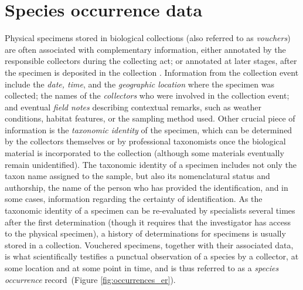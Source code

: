 \section{Species occurrence data} \label{section:occurrence_data}
Physical specimens stored in biological collections (also referred to as \textit{vouchers}) are often associated with complementary information, either annotated by the responsible collectors during the collecting act; or annotated at later stages, after the specimen is deposited in the collection \cite{Chapman2005}.
Information from the collection event include the \textit{date, time}, and the \textit{geographic location} where the specimen was collected; the names of the \textit{collectors} who were involved in the collection event; and eventual \textit{field notes} describing contextual remarks, such as weather conditions, habitat features, or the sampling method used.
Other crucial piece of information is the \textit{taxonomic identity} of the specimen, which can be determined by the collectors themselves or by professional taxonomists once the biological material is incorporated to the collection (although some materials eventually remain unidentified).
%
The taxonomic identity of a specimen includes not only the taxon name assigned to the sample, but also its nomenclatural status and authorship, the name of the person who has provided the identification, and in some cases, information regarding the certainty of identification.
As the taxonomic identity of a specimen can be re-evaluated by specialists several times after the first determination (though it requires that the investigator has access to the physical specimen), a history of determinations for specimens is usually stored in a collection.
%
Vouchered specimens, together with their associated data, is what scientifically testifies a punctual observation of a species by a collector, at some location and at some point in time, and is thus referred to as a \textit{species occurrence} record~(Figure \ref{fig:occurrences_er}).

